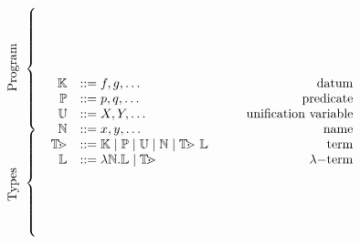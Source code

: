 \documentclass[varwidth]{standalone}
\begin{document}
%
\[
  \begin{array}{c}
    \begin{array}{r}
      \multirow{1}{*}{\rotatebox[origin=c]{90}{Program\hspace{-.5cm}}}~\left\{\begin{array}{@{}c@{}}\null\\\null\\\null\\\null\\\null\\\null\\\null\\\null\\\end{array} \right. \\
      \multirow{1}{*}{\rotatebox[origin=c]{90}{Types\hspace{-.22cm}}}~\left\{\begin{array}{@{}c@{}}\null\\\null\\\null\\\null\\\null\\\null\\\null\\\end{array}\right.
    \end{array}
    \begin{array}{rlr}
      \DATA        & ::= f, g, \ldots                                                          & \qquad \mathrm{datum}                 \\
      \PRED        & ::= p, q, \ldots                                                          & \qquad \mathrm{predicate}             \\
      \UVAR        & ::= X, Y, \ldots                                                          & \qquad \mathrm{unification\ variable} \\
      \NVAR        & ::= x, y, \ldots                                                          & \qquad \mathrm{name}     \\
      \TERM        & ::= \DATA \mid \PRED \mid \UVAR \mid \NVAR \mid \TERM\ \LTERM             & \qquad \mathrm{term}                  \\
      \LTERM       & ::= \lambda \NVAR. \LTERM \mid \TERM                                      & \qquad \lambda\mathrm{-term}          \\

\end{array}
\end{array}\]
\end{document}
